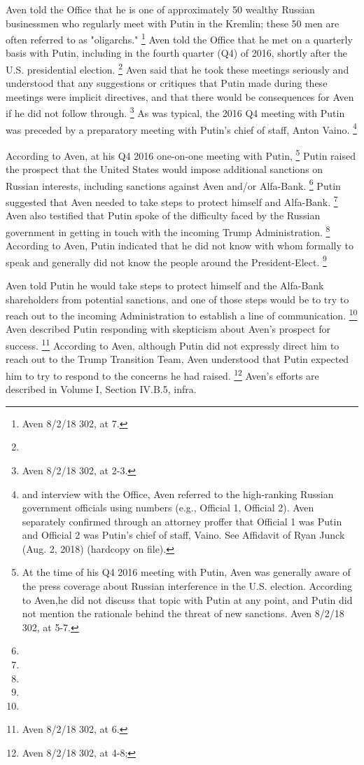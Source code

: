 Aven told the Office that he is one of approximately 50 wealthy Russian businessmen who regularly meet with Putin in the Kremlin; these 50 men are often referred to as "oligarchs."%
\footnote{Aven 8/2/18 302, at 7.}
Aven told the Office that he met on a quarterly basis with Putin, including in the fourth quarter (Q4) of 2016, shortly after the U.S. presidential election.%
\footnote{}
Aven said that he took these meetings seriously and understood that any suggestions or critiques that Putin made during these meetings were implicit directives, and that there would be consequences for Aven if he did not follow through.%
\footnote{Aven 8/2/18 302, at 2-3.}
As was typical, the 2016 Q4 meeting with Putin was preceded by a preparatory meeting with Putin's chief of staff, Anton Vaino.%
\footnote{ and interview with the Office, Aven referred to the high-ranking Russian government officials using numbers (e.g., Official 1, Official 2).
Aven separately confirmed through an attorney proffer that Official 1 was Putin and Official 2 was Putin’s chief of staff, Vaino.
See Affidavit of Ryan Junck (Aug. 2, 2018) (hardcopy on file).}

According to Aven, at his Q4 2016 one-on-one meeting with Putin,%
\footnote{At the time of his Q4 2016 meeting with Putin, Aven was generally aware of the press coverage about Russian interference in the U.S. election.
According to Aven,he did not discuss that topic with Putin at any point, and Putin did not mention the rationale behind the threat of new sanctions.
Aven 8/2/18 302, at 5-7.}
Putin raised the prospect that the United States would impose additional sanctions on Russian interests, including sanctions against Aven and/or Alfa-Bank.%
\footnote{}
Putin suggested that Aven needed to take steps to protect himself and Alfa-Bank.%
\footnote{}
Aven also testified that Putin spoke of the difficulty faced by the Russian government in getting in touch with the incoming Trump Administration.%
\footnote{}
According to Aven, Putin indicated that he did not know with whom formally to speak and generally did not know the people around the President-Elect.%
\footnote{}

Aven
told Putin he would take steps to protect himself and the Alfa-Bank shareholders from potential sanctions, and one of those steps would be to try to reach out to the incoming Administration to establish a line of communication.%
\footnote{}
Aven described Putin responding with skepticism about Aven's prospect for success.%
\footnote{ Aven 8/2/18 302, at 6.}
According to Aven, although Putin did not expressly direct him to reach out to the Trump Transition Team, Aven understood that Putin expected him to try to respond to the concerns he had raised.%
\footnote{Aven 8/2/18 302, at 4-8; }
Aven's efforts are described in Volume I, Section IV.B.5, infra.

